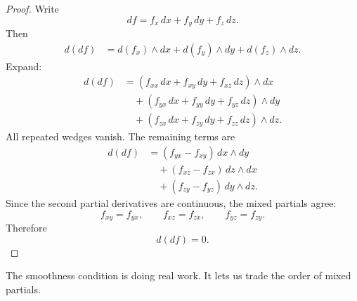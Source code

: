 \begin{proof}
Write
\[
    df=f_x\,dx+f_y\,dy+f_z\,dz.
\]
Then
\[
\begin{aligned}
d(df)
&=
d(f_x)\wedge dx+d(f_y)\wedge dy+d(f_z)\wedge dz.
\end{aligned}
\]
Expand:
\[
\begin{aligned}
d(df)
&=
(f_{xx}\,dx+f_{xy}\,dy+f_{xz}\,dz)\wedge dx\\
&\quad+
(f_{yx}\,dx+f_{yy}\,dy+f_{yz}\,dz)\wedge dy\\
&\quad+
(f_{zx}\,dx+f_{zy}\,dy+f_{zz}\,dz)\wedge dz.
\end{aligned}
\]
All repeated wedges vanish.  The remaining terms are
\[
\begin{aligned}
d(df)
&=
(f_{yx}-f_{xy})\,dx\wedge dy\\
&\quad+
(f_{xz}-f_{zx})\,dz\wedge dx\\
&\quad+
(f_{zy}-f_{yz})\,dy\wedge dz.
\end{aligned}
\]
Since the second partial derivatives are continuous, the mixed partials agree:
\[
    f_{xy}=f_{yx},
    \qquad
    f_{xz}=f_{zx},
    \qquad
    f_{yz}=f_{zy}.
\]
Therefore
\[
    d(df)=0.
\]
\end{proof}

The smoothness condition is doing real work.  It lets us trade the order of mixed
partials.

